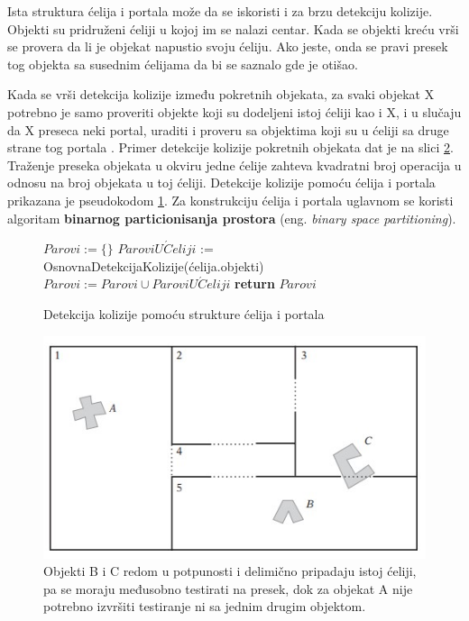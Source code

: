\documentclass[12pt,oneside]{memoir}
\begin{document}
Ista struktura ćelija i portala može da se iskoristi i za brzu detekciju kolizije. 
Objekti su pridruženi ćeliji u kojoj im se nalazi centar. Kada se objekti kreću vrši 
se provera da li je objekat napustio svoju ćeliju. Ako jeste, onda se pravi presek tog objekta
sa susednim ćelijama da bi se saznalo gde je otišao. 

Kada se vrši detekcija kolizije između pokretnih objekata, za svaki objekat X 
potrebno je samo proveriti objekte koji su dodeljeni istoj ćeliji kao i X, i u slučaju
da X preseca neki portal, uraditi i proveru sa objektima koji su u ćeliji sa druge strane tog portala \cite{cells}.
Primer detekcije kolizije pokretnih objekata dat je na slici \ref{fig:cellsObj}.
Traženje preseka objekata u okviru jedne ćelije zahteva kvadratni broj operacija u odnosu na broj objekata u toj ćeliji.
Detekcije kolizije pomoću ćelija i portala prikazana je pseudokodom \ref{alg:cell}.
Za konstrukciju ćelija i portala uglavnom se koristi algoritam 
\textbf{binarnog particionisanja prostora} (eng. {\em binary space partitioning}).

\begin{figure}[!h]
    \label{alg:cell}
	\begin{algorithmic}[1]
		\State $Parovi := \{ \}$
			\State $ParoviU\acute{C}eliji$ := OsnovnaDetekcijaKolizije(ćelija.objekti)
			\State $Parovi:=Parovi \cup ParoviU\acute{C}eliji$
		\EndFor
		\State \textbf{return} $Parovi$
		\EndProcedure
	\end{algorithmic}
	\caption{Detekcija kolizije pomoću strukture ćelija i portala}
\end{figure}

\begin{figure}[h!]
	\begin{center}
	\includegraphics[scale=1]{cellsObj.jpg}
	\end{center}
	\caption{ Objekti B i C redom u potpunosti i delimično pripadaju istoj ćeliji, pa se moraju međusobno testirati na presek,
	 dok za objekat A nije potrebno izvršiti testiranje ni sa jednim drugim objektom. }
	\label{fig:cellsObj}
\end{figure}
\end{document}
